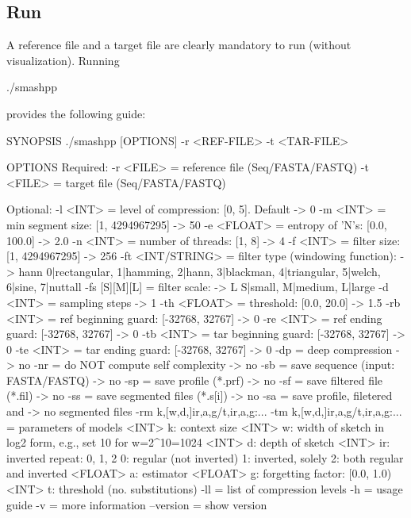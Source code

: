 \subsection{Run}
A reference file and a target file are clearly mandatory to run \smashpp (without visualization). Running
\begin{code}[style=bash]
./smashpp
\end{code}
provides the following guide:
\begin{code}[style=bash]
SYNOPSIS
  ./smashpp [OPTIONS]  -r <REF-FILE>  -t <TAR-FILE>

OPTIONS
  Required:
  -r  <FILE>         = reference file (Seq/FASTA/FASTQ)
  -t  <FILE>         = target file    (Seq/FASTA/FASTQ)

  Optional:
  -l  <INT>          = level of compression: [0, 5]. Default -> 0
  -m  <INT>          = min segment size: [1, 4294967295]     -> 50
  -e  <FLOAT>        = entropy of 'N's: [0.0, 100.0]         -> 2.0
  -n  <INT>          = number of threads: [1, 8]             -> 4
  -f  <INT>          = filter size: [1, 4294967295]          -> 256
  -ft <INT/STRING>   = filter type (windowing function):     -> hann
                       {0|rectangular, 1|hamming, 2|hann,
                       3|blackman, 4|triangular, 5|welch,
                       6|sine, 7|nuttall}
  -fs [S][M][L]      = filter scale:                         -> L
                       {S|small, M|medium, L|large}
  -d  <INT>          = sampling steps                        -> 1
  -th <FLOAT>        = threshold: [0.0, 20.0]                -> 1.5
  -rb <INT>          = ref beginning guard: [-32768, 32767]  -> 0
  -re <INT>          = ref ending guard: [-32768, 32767]     -> 0
  -tb <INT>          = tar beginning guard: [-32768, 32767]  -> 0
  -te <INT>          = tar ending guard: [-32768, 32767]     -> 0
  -dp                = deep compression                      -> no
  -nr                = do NOT compute self complexity        -> no
  -sb                = save sequence (input: FASTA/FASTQ)    -> no
  -sp                = save profile (*.prf)                  -> no
  -sf                = save filtered file (*.fil)            -> no
  -ss                = save segmented files (*.s[i])         -> no
  -sa                = save profile, filetered and           -> no
                       segmented files
  -rm k,[w,d,]ir,a,g/t,ir,a,g:...
  -tm k,[w,d,]ir,a,g/t,ir,a,g:...
                     = parameters of models
                <INT>  k:  context size
                <INT>  w:  width of sketch in log2 form,
                           e.g., set 10 for w=2^10=1024
                <INT>  d:  depth of sketch
                <INT>  ir: inverted repeat: {0, 1, 2}
                           0: regular (not inverted)
                           1: inverted, solely
                           2: both regular and inverted
              <FLOAT>  a:  estimator
              <FLOAT>  g:  forgetting factor: [0.0, 1.0)
                <INT>  t:  threshold (no. substitutions)
  -ll                = list of compression levels
  -h                 = usage guide
  -v                 = more information
  --version          = show version
\end{code}

